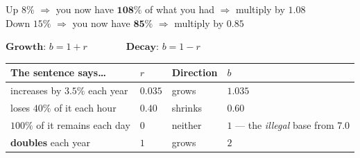 \documentclass[aspectratio=169, 11pt]{beamer}
\begin{document}
\begin{frame}[t, plain]
  \begin{center}
    Up $8\%$ $\Rightarrow$ you now have $\mathbf{108\%}$ of what you had $\Rightarrow$ multiply by
    $\mathbf{1.08}$ \\[3pt]
    Down $15\%$ $\Rightarrow$ you now have $\mathbf{85\%}$ $\Rightarrow$ multiply by $\mathbf{0.85}$
  \end{center}
  \vspace{4pt}
  \begin{center}
    \Large $\textbf{Growth: } b = 1+r \qquad\qquad \textbf{Decay: } b = 1-r$
  \end{center}
  \vspace{6pt}
  \begin{center}
  \footnotesize
  \renewcommand{\arraystretch}{1.3}
  \begin{tabular}{llll}
  \hline
  \textbf{The sentence says\dots} & \textbf{$r$} & \textbf{Direction} & \textbf{$b$} \\
  \hline
  increases by $3.5\%$ each year & $0.035$ & grows & $1.035$ \\
  loses $40\%$ of it each hour & $0.40$ & shrinks & $0.60$ \\
  $100\%$ of it remains each day & $0$ & neither & $1$ --- the \emph{illegal} base from 7.0 \\
  \textbf{doubles} each year & $1$ & grows & $2$ \\
  \hline
  \end{tabular}
  \end{center}
\end{frame}
\end{document}
